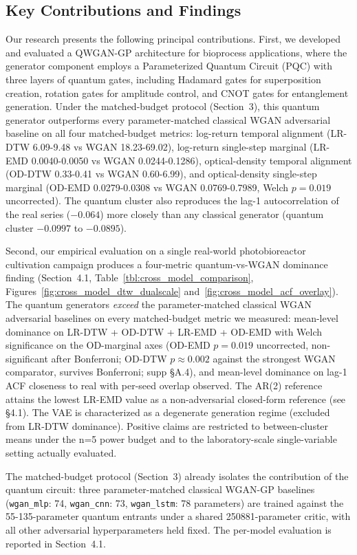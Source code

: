 \documentclass[12pt,twocolumn]{article}
\begin{document}
\subsection{Key Contributions and Findings}

Our research presents the following principal contributions. First, we developed and evaluated a QWGAN-GP architecture for bioprocess applications, where the generator component employs a Parameterized Quantum Circuit (PQC) with three layers of quantum gates, including Hadamard gates for superposition creation, rotation gates for amplitude control, and CNOT gates for entanglement generation. Under the matched-budget protocol (Section~3), this quantum generator outperforms every parameter-matched classical WGAN adversarial baseline on all four matched-budget metrics: log-return temporal alignment (LR-DTW 6.09-9.48 vs WGAN 18.23-69.02), log-return single-step marginal (LR-EMD 0.0040-0.0050 vs WGAN 0.0244-0.1286), optical-density temporal alignment (OD-DTW 0.33-0.41 vs WGAN 0.60-6.99), and optical-density single-step marginal (OD-EMD 0.0279-0.0308 vs WGAN 0.0769-0.7989, Welch $p = 0.019$ uncorrected). The quantum cluster also reproduces the lag-1 autocorrelation of the real series ($-0.064$) more closely than any classical generator (quantum cluster $-0.0997$ to $-0.0895$).

Second, our empirical evaluation on a single real-world photobioreactor cultivation campaign produces a four-metric quantum-vs-WGAN dominance finding (Section~4.1, Table~\ref{tbl:cross_model_comparison}, Figures~\ref{fig:cross_model_dtw_dualscale} and~\ref{fig:cross_model_acf_overlay}). The quantum generators \emph{exceed} the parameter-matched classical WGAN adversarial baselines on every matched-budget metric we measured: mean-level dominance on LR-DTW + OD-DTW + LR-EMD + OD-EMD with Welch significance on the OD-marginal axes (OD-EMD $p = 0.019$ uncorrected, non-significant after Bonferroni; OD-DTW $p \approx 0.002$ against the strongest WGAN comparator, survives Bonferroni; supp \S A.4), and mean-level dominance on lag-1 ACF closeness to real with per-seed overlap observed. The AR(2) reference attains the lowest LR-EMD value as a non-adversarial closed-form reference (see \S4.1). The VAE is characterized as a degenerate generation regime (excluded from LR-DTW dominance). Positive claims are restricted to between-cluster means under the n=5 power budget and to the laboratory-scale single-variable setting actually evaluated.

The matched-budget protocol (Section~3) already isolates the contribution of the
quantum circuit: three parameter-matched classical WGAN-GP baselines
(\texttt{wgan\_mlp}: 74, \texttt{wgan\_cnn}: 73, \texttt{wgan\_lstm}: 78 parameters)
are trained against the 55-135-parameter quantum entrants under a shared
250881-parameter critic, with all other adversarial hyperparameters held fixed.
The per-model evaluation is reported in Section~4.1.
\end{document}
